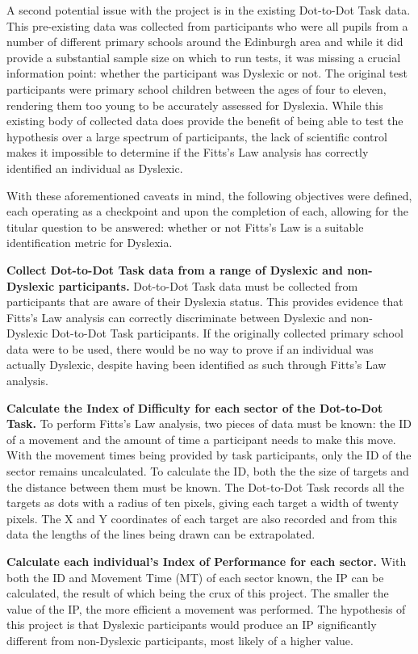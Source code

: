 			A second potential issue with the project is in the existing Dot-to-Dot Task data. This pre-existing data was collected from participants who were all pupils from a number of different primary schools around the Edinburgh area and while it did provide a substantial sample size on which to run tests, it was missing a crucial information point: whether the participant was Dyslexic or not. The original test participants were primary school children between the ages of four to eleven, rendering them too young to be accurately assessed for Dyslexia. While this existing body of collected data does provide the benefit of being able to test the hypothesis over a large spectrum of participants, the lack of scientific control makes it impossible to determine if the Fitts’s Law analysis has correctly identified an individual as Dyslexic.
		
			With these aforementioned caveats in mind, the following objectives were defined, each operating as a checkpoint and upon the completion of each, allowing for the titular question to be answered: whether or not Fitts’s Law is a suitable identification metric for Dyslexia.
		
			\textbf{Collect Dot-to-Dot Task data from a range of Dyslexic and non-Dyslexic participants.
			}Dot-to-Dot Task data must be collected from participants that are aware of their Dyslexia status. This provides evidence that Fitts’s Law analysis can correctly discriminate between Dyslexic and non-Dyslexic Dot-to-Dot Task participants. If the originally collected primary school data were to be used, there would be no way to prove if an individual was actually Dyslexic, despite having been identified as such through Fitts’s Law analysis.
			
			\textbf{Calculate the Index of Difficulty for each sector of the Dot-to-Dot Task.}
			To perform Fitts’s Law analysis, two pieces of data must be known: the ID of a movement and the amount of time a participant needs to make this move. With the movement times being provided by task participants, only the ID of the sector remains uncalculated. To calculate the ID, both the the size of targets and the distance between them must be known. The Dot-to-Dot Task records all the targets as dots with a radius of ten pixels, giving each target a width of twenty pixels. The X and Y coordinates of each target are also recorded and from this data the lengths of the lines being drawn can be extrapolated.
			
			\textbf{Calculate each individual's Index of Performance for each sector.}
			With both the ID and Movement Time (MT) of each sector known, the IP can be calculated, the result of which being the crux of this project. The smaller the value of the IP, the more efficient a movement was performed. The hypothesis of this project is that Dyslexic participants would produce an IP significantly different from non-Dyslexic participants, most likely of a higher value.
			
